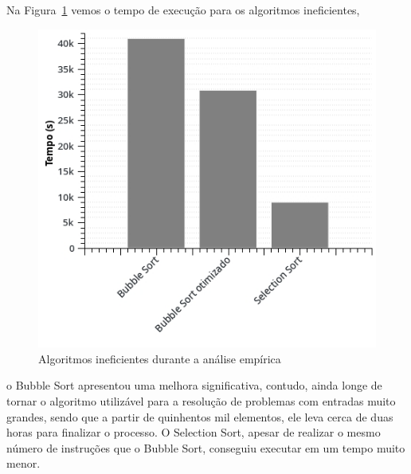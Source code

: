 Na Figura~\ref{fig:ineficientes} vemos o tempo de execução para os algoritmos ineficientes, 
\begin{figure}[ht]
\centering
\includegraphics[scale=0.9]{images/ineficientes_graph.jpg}
\caption{Algoritmos ineficientes durante a análise empírica}
\label{fig:ineficientes}
\end{figure}
o Bubble Sort apresentou uma melhora significativa, contudo, ainda longe de tornar o algoritmo utilizável para a resolução de problemas com entradas muito grandes, sendo que a partir de quinhentos mil elementos, ele leva cerca de duas horas para finalizar o processo. O Selection Sort, apesar de realizar o mesmo número de instruções que o Bubble Sort, conseguiu executar em um tempo muito menor.
